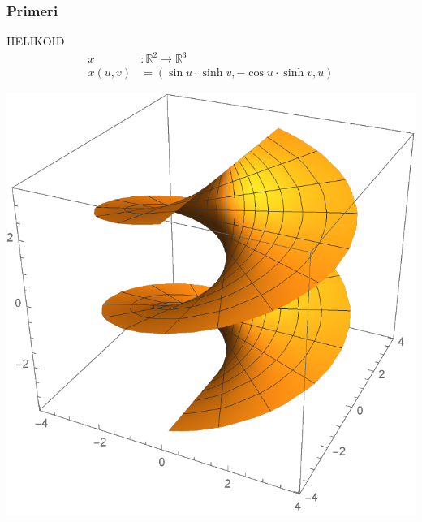 \documentclass[9pt, table]{beamer}
\newcommand{\R}{\mathbb R}
\begin{document}
\begin{frame}
\frametitle{Primeri}

HELIKOID
\begin{align*}
x &\colon \R^{2} \to \R^{3} \\
x(u,v) &= (\sin u \cdot \sinh v, -\cos u \cdot \sinh v, u)
\end{align*}
%
\begin{center}
\includegraphics[scale=0.4]{helicoid.pdf}
\end{center}

\end{frame}

\end{document}
